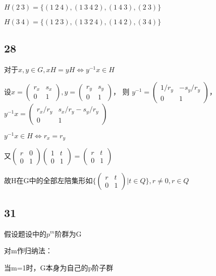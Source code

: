 \documentclass[UTF8]{ctexart}
\begin{document}
$H(2\ 3) = \{(1\ 2\ 4), (1\ 3\ 4\ 2), (1\ 4\ 3), (2\ 3)\}$

$H(3\ 4) = \{(1\ 2\ 3), (1\ 3\ 2\ 4), (1\ 4\ 2), (3\ 4)\}$

\subsection*{28}

对于$x, y\in G, xH=yH\Leftrightarrow y^{-1}x\in H$

设$x = \begin{pmatrix}
    r_x& s_x\\
    0& 1
\end{pmatrix}, 
y = \begin{pmatrix}
    r_y& s_y\\
    0& 1
\end{pmatrix}$，
则
$y^{-1} = \begin{pmatrix}
    1/r_y& -s_y/r_y\\
    0& 1
\end{pmatrix}$，
$y^{-1}x = \begin{pmatrix}
    r_x/r_y& s_x / r_y - s_y/r_y\\
    0& 1
\end{pmatrix}$

$y^{-1}x\in H\Leftrightarrow r_x = r_y$

又$\begin{pmatrix}
    r& 0\\
    0& 1
\end{pmatrix}\begin{pmatrix}
    1& t\\
    0& 1
\end{pmatrix} = \begin{pmatrix}
    r& t\\
    0& 1
\end{pmatrix}$

故H在G中的全部左陪集形如$\{
    \begin{pmatrix}
        r& t\\
        0& 1
    \end{pmatrix} | t\in Q
\}, r\neq 0, r\in Q$

\subsection*{31}

假设题设中的$p^m$阶群为G

对m作归纳法：

当m=1时，G本身为自己的p阶子群
\end{document}
